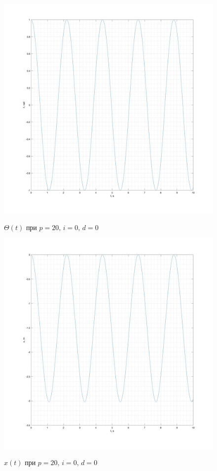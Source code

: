 \documentclass[a5paper, 10pt]{article}
\theoremstyle{definition}
\theoremstyle{plain}
\theoremstyle{remark}
\begin{document}
\begin{figure}[!h]
		{\includegraphics[width=1\linewidth]{"./graphics/tet_20_0_0.jpg"}}
	           \caption{$\Theta (t)$ при $p = 20, \, i = 0, \, d = 0$}
\end{figure}
\begin{figure}[!h]
		{\includegraphics[width=1\linewidth]{"./graphics/x_20_0_0.jpg"}}
	           \caption{$x(t)$  при $p = 20, \, i = 0, \, d = 0$}
\end{figure}
\end{document}
